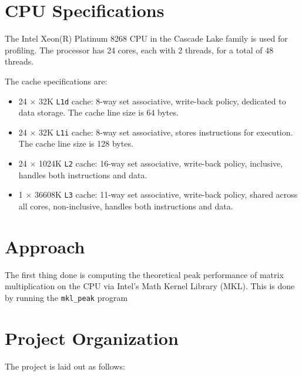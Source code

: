 \documentclass[12pt]{article}
\begin{document}
\section{CPU Specifications}
The Intel Xeon(R) Platinum 8268 CPU in the Cascade Lake family is used for profiling. 
The processor has 24 cores, each with 2 threads, for a total of 48 threads. 

\noindent The cache specifications are:
\begin{itemize}
    \item 24 $\times$ 32K \texttt{L1d} cache: 8-way set associative, write-back policy, dedicated to data storage. The cache line size is 64 bytes.
    \item 24 $\times$ 32K \texttt{L1i} cache: 8-way set associative, stores instructions for execution. The cache line size is 128 bytes.
    \item 24 $\times$ 1024K \texttt{L2} cache: 16-way set associative, write-back policy, inclusive, handles both instructions and data.
    \item 1 $\times$ 36608K \texttt{L3} cache: 11-way set associative, write-back policy, shared across all cores, non-inclusive, handles both instructions and data.
\end{itemize}

\section{Approach}
The first thing done is computing the theoretical peak performance of matrix multiplication 
on the CPU via Intel's Math Kernel Library (MKL). This is done by running the \texttt{mkl\_peak} program

\newpage
\section{Project Organization}

The project is laid out as follows:
\end{document}
